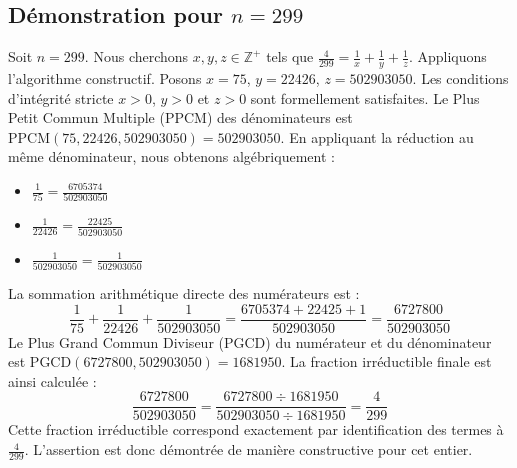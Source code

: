 \documentclass[11pt,a4paper]{article}
\begin{document}
\subsection{Démonstration pour $n = 299$}
Soit $n = 299$. Nous cherchons $x, y, z \in \mathbb{Z}^{+}$ tels que $\frac{4}{299} = \frac{1}{x} + \frac{1}{y} + \frac{1}{z}$.
Appliquons l'algorithme constructif. Posons $x = 75$, $y = 22426$, $z = 502903050$.
Les conditions d'intégrité stricte $x > 0$, $y > 0$ et $z > 0$ sont formellement satisfaites.
Le Plus Petit Commun Multiple (PPCM) des dénominateurs est $\text{PPCM}(75, 22426, 502903050) = 502903050$.
En appliquant la réduction au même dénominateur, nous obtenons algébriquement :
\begin{itemize}
    \item $\frac{1}{75} = \frac{6705374}{502903050}$
    \item $\frac{1}{22426} = \frac{22425}{502903050}$
    \item $\frac{1}{502903050} = \frac{1}{502903050}$
\end{itemize}
La sommation arithmétique directe des numérateurs est :
$$ \frac{1}{75} + \frac{1}{22426} + \frac{1}{502903050} = \frac{6705374 + 22425 + 1}{502903050} = \frac{6727800}{502903050} $$
Le Plus Grand Commun Diviseur (PGCD) du numérateur et du dénominateur est $\text{PGCD}(6727800, 502903050) = 1681950$.
La fraction irréductible finale est ainsi calculée :
$$ \frac{6727800}{502903050} = \frac{6727800 \div 1681950}{502903050 \div 1681950} = \frac{4}{299} $$
Cette fraction irréductible correspond exactement par identification des termes à $\frac{4}{299}$. L'assertion est donc démontrée de manière constructive pour cet entier.
\end{document}
